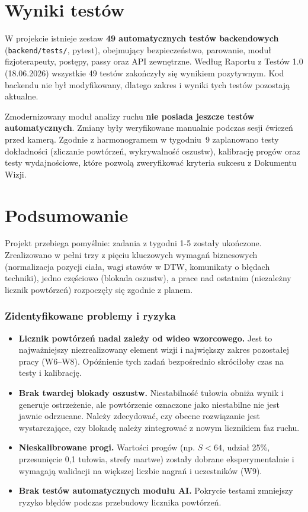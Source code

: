 \documentclass[11pt,a4paper]{article}
\begin{document}
\section{Wyniki testów}
W projekcie istnieje zestaw \textbf{49 automatycznych testów backendowych} (\texttt{backend/tests/}, pytest), obejmujący bezpieczeństwo, parowanie, moduł fizjoterapeuty, postępy, passy oraz API zewnętrzne. Według Raportu z Testów 1.0 (18.06.2026) wszystkie 49 testów zakończyły się wynikiem pozytywnym. Kod backendu nie był modyfikowany, dlatego zakres i wyniki tych testów pozostają aktualne.

Zmodernizowany moduł analizy ruchu \textbf{nie posiada jeszcze testów automatycznych}. Zmiany były weryfikowane manualnie podczas sesji ćwiczeń przed kamerą. Zgodnie z harmonogramem w tygodniu~9 zaplanowano testy dokładności (zliczanie powtórzeń, wykrywalność oszustw), kalibrację progów oraz testy wydajnościowe, które pozwolą zweryfikować kryteria sukcesu z Dokumentu Wizji.

\section{Podsumowanie}
Projekt przebiega pomyślnie: zadania z tygodni 1-5 zostały ukończone. Zrealizowano w pełni trzy z pięciu kluczowych wymagań biznesowych (normalizacja pozycji ciała, wagi stawów w DTW, komunikaty o błędach techniki), jedno częściowo (blokada oszustw), a prace nad ostatnim (niezależny licznik powtórzeń) rozpoczęły się zgodnie z planem.

\subsubsection*{Zidentyfikowane problemy i ryzyka}
\begin{itemize}
    \item \textbf{Licznik powtórzeń nadal zależy od wideo wzorcowego.} Jest to najważniejszy niezrealizowany element wizji i największy zakres pozostałej pracy (W6--W8). Opóźnienie tych zadań bezpośrednio skróciłoby czas na testy i kalibrację.
    \item \textbf{Brak twardej blokady oszustw.} Niestabilność tułowia obniża wynik i generuje ostrzeżenie, ale powtórzenie oznaczone jako niestabilne nie jest jawnie odrzucane. Należy zdecydować, czy obecne rozwiązanie jest wystarczające, czy blokadę należy zintegrować z nowym licznikiem faz ruchu.
    \item \textbf{Nieskalibrowane progi.} Wartości progów (np. $S<64$, udział 25\%, przesunięcie 0,1 tułowia, strefy martwe) zostały dobrane eksperymentalnie i wymagają walidacji na większej liczbie nagrań i uczestników (W9).
    \item \textbf{Brak testów automatycznych modułu AI.} Pokrycie testami zmniejszy ryzyko błędów podczas przebudowy licznika powtórzeń.
\end{itemize}
\end{document}
